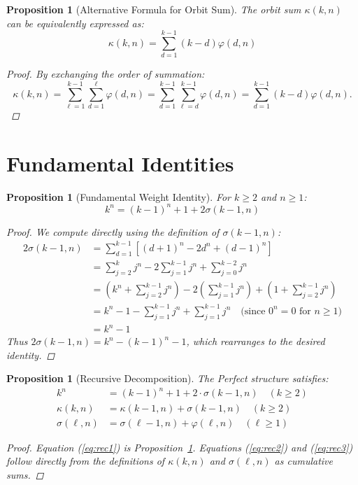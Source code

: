 \documentclass[11pt]{article}
\newtheorem{proposition}[definition]{Proposition}
\begin{document}
\begin{proposition}[Alternative Formula for Orbit Sum]\label{prop:orbit-sum-alternative}
The orbit sum $\kappa(k,n)$ can be equivalently expressed as:
\[
\kappa(k,n) = \sum_{d=1}^{k-1} (k-d) \varphi(d,n)
\]
\begin{proof}
By exchanging the order of summation:
\[
\kappa(k,n) = \sum_{\ell=1}^{k-1} \sum_{d=1}^{\ell} \varphi(d,n) 
= \sum_{d=1}^{k-1} \sum_{\ell=d}^{k-1} \varphi(d,n) 
= \sum_{d=1}^{k-1} (k-d) \varphi(d,n).
\]
\end{proof}
\end{proposition}



\section{Fundamental Identities}\label{sec:identities}

\begin{proposition}[Fundamental Weight Identity]\label{prop:fundamental-identity}
For $k \geq 2$ and $n \geq 1$:
\[
k^n = (k-1)^n + 1 + 2\sigma(k-1,n)
\]
\begin{proof}
We compute directly using the definition of $\sigma(k-1,n)$:
\begin{align*}
2\sigma(k-1,n) &= \sum_{d=1}^{k-1} \left[(d+1)^n - 2d^n + (d-1)^n\right] \\
&= \sum_{j=2}^{k} j^n - 2\sum_{j=1}^{k-1} j^n + \sum_{j=0}^{k-2} j^n \\
&= \left(k^n + \sum_{j=2}^{k-1} j^n\right) - 2\left(\sum_{j=1}^{k-1} j^n\right) + \left(1 + \sum_{j=2}^{k-1} j^n\right) \\
&= k^n - 1 - \sum_{j=1}^{k-1} j^n + \sum_{j=1}^{k-1} j^n \quad \text{(since $0^n = 0$ for $n \geq 1$)} \\
&= k^n - 1
\end{align*}
Thus $2\sigma(k-1,n) = k^n - (k-1)^n - 1$, which rearranges to the desired identity.
\end{proof}
\end{proposition}

\begin{proposition}[Recursive Decomposition]\label{prop:recursive-decomposition}
The Perfect structure satisfies:
\begin{align}
k^{n} &= (k-1)^{n} + 1 + 2 \cdot \sigma(k-1,n) \quad (k \geq 2) \label{eq:rec1} \\
\kappa(k,n) &= \kappa(k-1,n) + \sigma(k-1,n) \quad (k \geq 2) \label{eq:rec2} \\
\sigma(\ell,n) &= \sigma(\ell-1,n) + \varphi(\ell,n) \quad (\ell \geq 1) \label{eq:rec3}
\end{align}
\begin{proof}
Equation (\ref{eq:rec1}) is Proposition~\ref{prop:fundamental-identity}. Equations (\ref{eq:rec2}) and (\ref{eq:rec3}) follow directly from the definitions of $\kappa(k,n)$ and $\sigma(\ell,n)$ as cumulative sums.
\end{proof}
\end{proposition}
\end{document}

